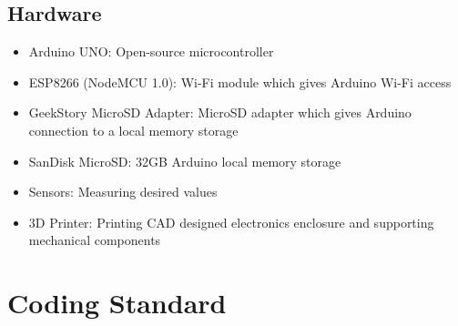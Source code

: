 \documentclass[12pt]{article}
\begin{document}
\newpage

\subsection{Hardware}
\begin{itemize}
	\item Arduino UNO: Open-source microcontroller 
	\item ESP8266 (NodeMCU 1.0): Wi-Fi module which gives Arduino Wi-Fi access
	\item GeekStory MicroSD Adapter: MicroSD adapter which gives Arduino connection to a local memory storage
	\item SanDisk MicroSD: 32GB Arduino local memory storage 
	\item Sensors: Measuring desired values
	\item 3D Printer: Printing CAD designed electronics enclosure and supporting mechanical components
\end{itemize}



\section{Coding Standard}
\end{document}
